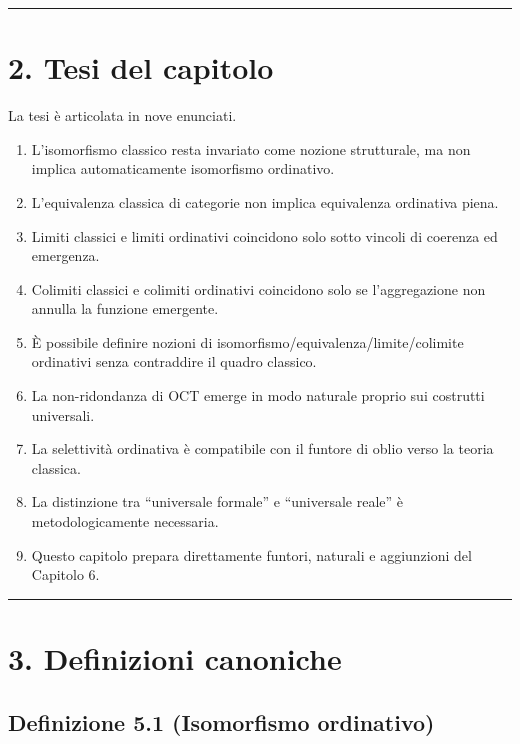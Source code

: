 \begin{center}\rule{0.5\linewidth}{0.5pt}\end{center}

\section{2. Tesi del capitolo}

La tesi è articolata in nove enunciati.

\begin{enumerate}
\def\labelenumi{\arabic{enumi}.}
\tightlist
\item
  L'isomorfismo classico resta invariato come nozione strutturale, ma non implica automaticamente isomorfismo ordinativo.
\item
  L'equivalenza classica di categorie non implica equivalenza ordinativa piena.
\item
  Limiti classici e limiti ordinativi coincidono solo sotto vincoli di coerenza ed emergenza.
\item
  Colimiti classici e colimiti ordinativi coincidono solo se l'aggregazione non annulla la funzione emergente.
\item
  È possibile definire nozioni di isomorfismo/equivalenza/limite/colimite ordinativi senza contraddire il quadro classico.
\item
  La non-ridondanza di OCT emerge in modo naturale proprio sui costrutti universali.
\item
  La selettività ordinativa è compatibile con il funtore di oblio verso la teoria classica.
\item
  La distinzione tra ``universale formale'' e ``universale reale'' è metodologicamente necessaria.
\item
  Questo capitolo prepara direttamente funtori, naturali e aggiunzioni del Capitolo 6.
\end{enumerate}

\begin{center}\rule{0.5\linewidth}{0.5pt}\end{center}

\section{3. Definizioni canoniche}

\subsection{Definizione 5.1 (Isomorfismo ordinativo)}

